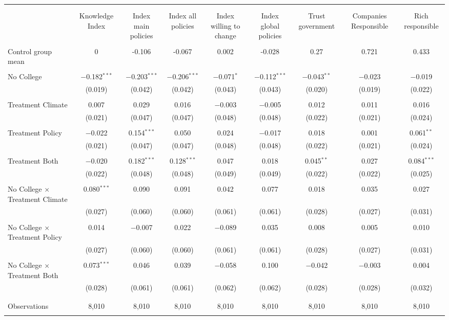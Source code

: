 
\begin{tabular}{@{\extracolsep{5pt}}lcccccccc} 
\\[-1.8ex]\hline 
\hline \\[-1.8ex] 
\\[-1.8ex] & Knowledge Index & Index main policies & Index all policies & Index willing to change & Index global policies & Trust government & Companies Responsible & Rich responsible \\ 
\hline \\[-1.8ex] 
 Control group mean & 0 & -0.106 & -0.067 & 0.002 & -0.028 & 0.27 & 0.721 & 0.433  \\ \hline \\[-1.8ex] No College & $-$0.182$^{***}$ & $-$0.203$^{***}$ & $-$0.206$^{***}$ & $-$0.071$^{*}$ & $-$0.112$^{***}$ & $-$0.043$^{**}$ & $-$0.023 & $-$0.019 \\ 
  & (0.019) & (0.042) & (0.042) & (0.043) & (0.043) & (0.020) & (0.019) & (0.022) \\ 
  & & & & & & & & \\ 
 Treatment Climate & 0.007 & 0.029 & 0.016 & $-$0.003 & $-$0.005 & 0.012 & 0.011 & 0.016 \\ 
  & (0.021) & (0.047) & (0.047) & (0.048) & (0.048) & (0.022) & (0.021) & (0.024) \\ 
  & & & & & & & & \\ 
 Treatment Policy & $-$0.022 & 0.154$^{***}$ & 0.050 & 0.024 & $-$0.017 & 0.018 & 0.001 & 0.061$^{**}$ \\ 
  & (0.021) & (0.047) & (0.047) & (0.048) & (0.048) & (0.022) & (0.021) & (0.024) \\ 
  & & & & & & & & \\ 
 Treatment Both & $-$0.020 & 0.182$^{***}$ & 0.128$^{***}$ & 0.047 & 0.018 & 0.045$^{**}$ & 0.027 & 0.084$^{***}$ \\ 
  & (0.022) & (0.048) & (0.048) & (0.049) & (0.049) & (0.022) & (0.022) & (0.025) \\ 
  & & & & & & & & \\ 
 No College $\times$ Treatment Climate & 0.080$^{***}$ & 0.090 & 0.091 & 0.042 & 0.077 & 0.018 & 0.035 & 0.027 \\ 
  & (0.027) & (0.060) & (0.060) & (0.061) & (0.061) & (0.028) & (0.027) & (0.031) \\ 
  & & & & & & & & \\ 
 No College $\times$ Treatment Policy & 0.014 & $-$0.007 & 0.022 & $-$0.089 & 0.035 & 0.008 & 0.005 & 0.010 \\ 
  & (0.027) & (0.060) & (0.060) & (0.061) & (0.061) & (0.028) & (0.027) & (0.031) \\ 
  & & & & & & & & \\ 
 No College $\times$ Treatment Both & 0.073$^{***}$ & 0.046 & 0.039 & $-$0.058 & 0.100 & $-$0.042 & $-$0.003 & 0.004 \\ 
  & (0.028) & (0.061) & (0.061) & (0.062) & (0.062) & (0.028) & (0.028) & (0.032) \\ 
  & & & & & & & & \\ 
\hline \\[-1.8ex] 

Observations & 8,010 & 8,010 & 8,010 & 8,010 & 8,010 & 8,010 & 8,010 & 8,010 \\ 
\hline 
\hline \\[-1.8ex] 
\end{tabular} 